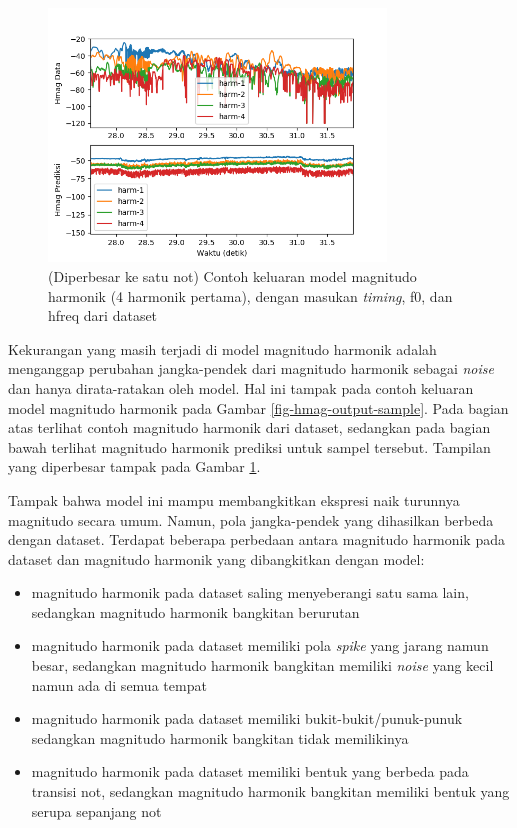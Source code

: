 \begin{figure}[htbp]
    \centering
    \includegraphics[width=0.8\textwidth]{resources/Analisis_Hmag_zoomed.png}
    \caption{(Diperbesar ke satu not) Contoh keluaran model magnitudo harmonik (4 harmonik pertama), dengan masukan \textit{timing}, f0, dan hfreq dari dataset}\label{fig-hmag-output-sample-zoomed}
\end{figure}

Kekurangan yang masih terjadi di model magnitudo harmonik adalah menganggap perubahan jangka-pendek dari magnitudo harmonik sebagai \textit{noise} dan hanya dirata-ratakan oleh model. Hal ini tampak pada contoh keluaran model magnitudo harmonik pada Gambar \ref{fig-hmag-output-sample}. Pada bagian atas terlihat contoh magnitudo harmonik dari dataset, sedangkan pada bagian bawah terlihat magnitudo harmonik prediksi untuk sampel tersebut. Tampilan yang diperbesar tampak pada Gambar \ref{fig-hmag-output-sample-zoomed}.

Tampak bahwa model ini mampu membangkitkan ekspresi naik turunnya magnitudo secara umum. Namun, pola jangka-pendek yang dihasilkan berbeda dengan dataset. Terdapat beberapa perbedaan antara magnitudo harmonik pada dataset dan magnitudo harmonik yang dibangkitkan dengan model:

\begin{itemize}
	\item magnitudo harmonik pada dataset saling menyeberangi satu sama lain, sedangkan magnitudo harmonik bangkitan berurutan
	\item magnitudo harmonik pada dataset memiliki pola \textit{spike} yang jarang namun besar, sedangkan magnitudo harmonik bangkitan memiliki \textit{noise} yang kecil namun ada di semua tempat
	\item magnitudo harmonik pada dataset memiliki bukit-bukit/punuk-punuk sedangkan magnitudo harmonik bangkitan tidak memilikinya
	\item magnitudo harmonik pada dataset memiliki bentuk yang berbeda pada transisi not, sedangkan magnitudo harmonik bangkitan memiliki bentuk yang serupa sepanjang not
\end{itemize}

